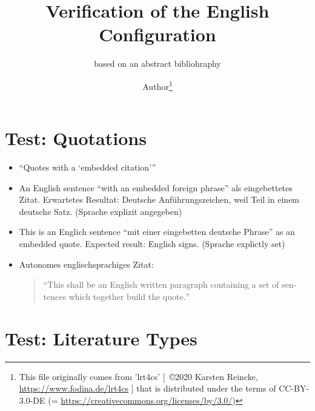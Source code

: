 \documentclass[
  DIV=calc,
  BCOR=5mm,
  11pt,
  headings=small,
  oneside,
  abstract=true,
  toc=bib,
  ngerman,english]{scrartcl}
\begin{document}
\nocite{*}

\titlehead{Bib\LaTeX}
\subject{Release 1.0}
\title{Verification of the English Configuration}
\subtitle{based on an abstract bibliohraphy}
\author{Author\footnote{This file originally comes from 'lrt4cs' [\ \copyright 2020 Karsten Reincke, \href{https://www.fodina.de/lrt4cs}{https://www.fodina.de/lrt4cs} ] that is distributed under the terms of CC-BY-3.0-DE (= \href{https://creativecommons.org/licenses/by/3.0/}{https://creativecommons.org/licenses/by/3.0/})}}


\maketitle

\footnotesize
\tableofcontents

\normalsize
\section{Test: Quotations}
\begin{itemize}

  \item \enquote{Quotes with a \enquote{embedded citation}}

  \item An English sentence \foreignquote{german}{with an embedded foreign phrase} als eingebettetes Zitat. Erwartetes Resultat: Deutsche Anführungszeichen, weil Teil in einem deutsche Satz. (Sprache explizit angegeben)

  \item This is an Englich sentence \foreignquote{english}{mit einer eingebetten deutsche Phrase} as an embedded quote. Expected result: English signs. (Sprache explictly set)

  \item Autonomes englischsprachiges Zitat:
  \begin{quote}\foreignquote{english}{This shall be an English written paragraph containing a set of sentences which together build the quote.}\end{quote}

\end{itemize}

\section{Test: Literature Types}
\end{document}
